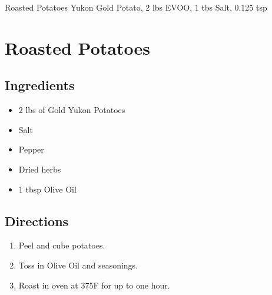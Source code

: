 Roasted Potatoes
  Yukon Gold Potato, 2 lbs
  EVOO, 1 tbs
  Salt, 0.125 tsp

\section{Roasted Potatoes}

\subsection{ Ingredients }

\begin{itemize}
  \item 2 lbs of Gold Yukon Potatoes
  \item Salt
  \item Pepper
  \item Dried herbs
  \item 1 tbsp Olive Oil
\end{itemize}

\subsection{ Directions }

\begin{enumerate}
  \item Peel and cube potatoes. 
  \item Toss in Olive Oil and seasonings. 
  \item Roast in oven at 375F for up to one hour. 
\end{enumerate}

